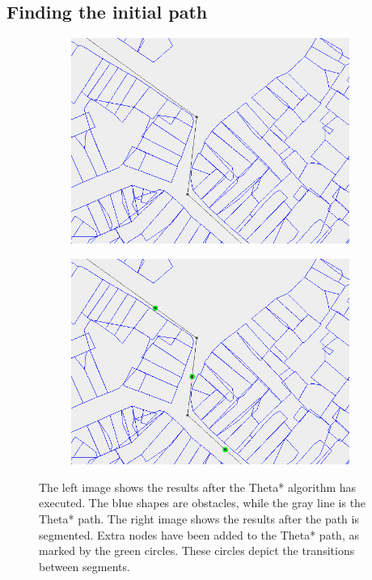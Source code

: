 \subsection{Finding the initial path}
\begin{figure}[!t]
    \centering
    \begin{subfigure}[t]{0.47\textwidth}
        \includegraphics[width=\textwidth]{img/pre1}
    \end{subfigure}
    \hfil
    \begin{subfigure}[t]{0.47\textwidth}
        \includegraphics[width=\textwidth]{img/pre2}
    \end{subfigure}
    \caption{The left image shows the results after the Theta* algorithm has executed. The blue shapes are obstacles, while the gray line is the Theta* path. The right image shows the results after the path is segmented. Extra nodes have been added to the Theta* path, as marked by the green circles. These circles depict the transitions between segments.}\label{fig:pre-1-2}
\end{figure}
